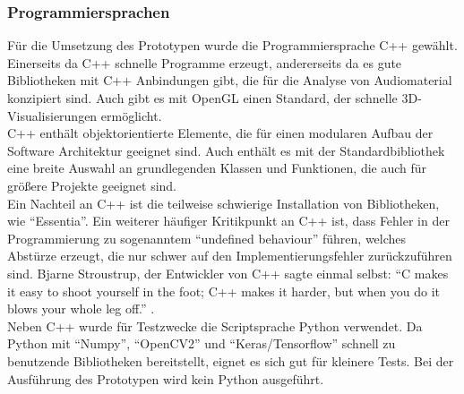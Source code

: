 \documentclass[11pt,a4paper]{article}
\begin{document}
\subsubsection{Programmiersprachen}
Für die Umsetzung des Prototypen wurde die Programmiersprache C++ gewählt. Einerseits da C++ schnelle Programme erzeugt, andererseits da es gute Bibliotheken mit C++ Anbindungen gibt, die für die Analyse von Audiomaterial konzipiert sind. Auch  gibt es mit OpenGL einen Standard, der schnelle 3D-Visualisierungen ermöglicht.\\
C++ enthält objektorientierte Elemente, die für einen modularen Aufbau der Software Architektur geeignet sind. Auch enthält es mit der Standardbibliothek eine breite Auswahl an grundlegenden Klassen und Funktionen, die auch für größere Projekte geeignet sind.\\
Ein Nachteil an C++ ist die teilweise schwierige Installation von Bibliotheken, wie ``Essentia''. Ein weiterer häufiger Kritikpunkt an C++ ist, dass Fehler in der Programmierung zu sogenanntem ``undefined behaviour'' führen, welches Abstürze erzeugt, die nur schwer auf den Implementierungsfehler zurückzuführen sind. Bjarne Stroustrup, der Entwickler von C++ sagte einmal selbst: ``C makes it easy to shoot yourself in the foot; C++ makes it harder, but when you do it blows your whole leg off.'' \cite{BjarneStroustrupCite}.\\
Neben C++ wurde für Testzwecke die Scriptsprache Python verwendet. Da Python mit ``Numpy'', ``OpenCV2'' und ``Keras/Tensorflow'' schnell zu benutzende Bibliotheken bereitstellt, eignet es sich gut für kleinere Tests. Bei der Ausführung des Prototypen wird kein Python ausgeführt.
\end{document}

